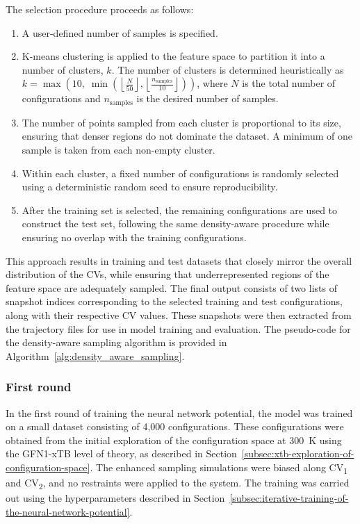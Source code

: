 The selection procedure proceeds as follows:
\begin{enumerate}
    \item A user-defined number of samples is specified.
    \item K-means clustering is applied to the feature space to partition it into a number of clusters, $k$. The number of clusters is determined heuristically as $k = \max\left(10, \; \min\left(\left\lfloor \frac{N}{50} \right\rfloor, \left\lfloor \frac{n_\text{samples}}{10} \right\rfloor \right)\right)$, where $N$ is the total number of configurations and $n_\text{samples}$ is the desired number of samples.
    \item The number of points sampled from each cluster is proportional to its size, ensuring that denser regions do not dominate the dataset. A minimum of one sample is taken from each non-empty cluster.
    \item Within each cluster, a fixed number of configurations is randomly selected using a deterministic random seed to ensure reproducibility.
    \item After the training set is selected, the remaining configurations are used to construct the test set, following the same density-aware procedure while ensuring no overlap with the training configurations.
\end{enumerate}

This approach results in training and test datasets that closely mirror the overall distribution of the CVs, while ensuring that underrepresented regions of the feature space are adequately sampled. The final output consists of two lists of snapshot indices corresponding to the selected training and test configurations, along with their respective CV values. These snapshots were then extracted from the trajectory files for use in model training and evaluation. The pseudo-code for the density-aware sampling algorithm is provided in Algorithm~\ref{alg:density_aware_sampling}.



\subsubsection{First round}
In the first round of training the neural network potential, the model was trained on a small dataset consisting of 4,000 configurations. These configurations were obtained from the initial exploration of the configuration space at 300~K using the GFN1-xTB level of theory, as described in Section~\ref{subsec:xtb-exploration-of-configuration-space}. The enhanced sampling simulations were biased along CV\textsubscript{1} and CV\textsubscript{2}, and no restraints were applied to the system. The training was carried out using the hyperparameters described in Section~\ref{subsec:iterative-training-of-the-neural-network-potential}.



